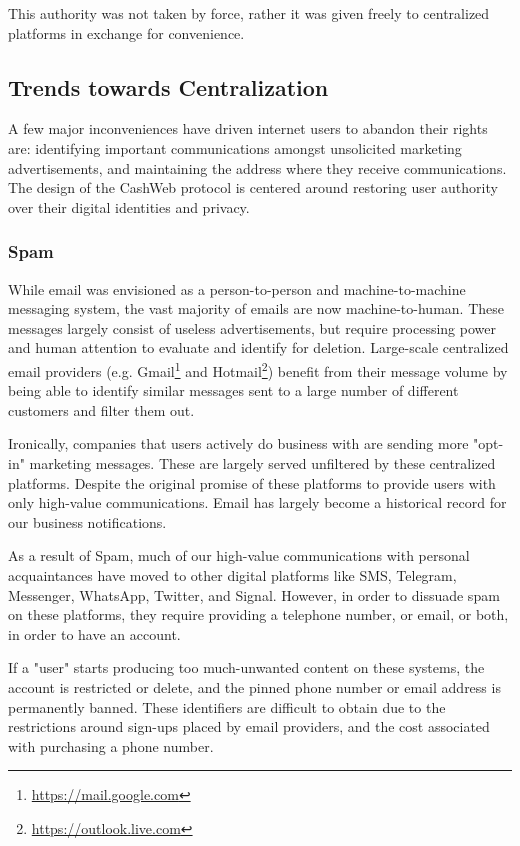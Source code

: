 \documentclass{article}
\begin{document}
This authority was not taken by force, rather it was given freely to centralized platforms in exchange for convenience.

\subsection{Trends towards Centralization}

A few major inconveniences have driven internet users to abandon their rights are: identifying important communications amongst unsolicited marketing advertisements, and maintaining the address where they receive communications. The design of the CashWeb protocol is centered around restoring user authority over their digital identities and privacy.

\subsubsection{Spam}

While email was envisioned as a person-to-person and machine-to-machine messaging system, the vast majority of emails are now machine-to-human. These messages largely consist of useless advertisements, but require processing power and human attention to evaluate and identify for deletion. Large-scale centralized email providers (e.g. Gmail\footnote{\url{https://mail.google.com}} and Hotmail\footnote{\url{https://outlook.live.com}}) benefit from their message volume by being able to identify similar messages sent to a large number of different customers and filter them out.

Ironically, companies that users actively do business with are sending more "opt-in" marketing messages. These are largely served unfiltered by these centralized platforms. Despite the original promise of these platforms to provide users with only high-value communications. Email has largely become a historical record for our business notifications.

As a result of Spam, much of our high-value communications with personal acquaintances have moved to other digital platforms like SMS, Telegram, Messenger, WhatsApp, Twitter, and Signal. However, in order to dissuade spam on these platforms, they require providing a telephone number, or email, or both, in order to have an account.

If a "user" starts producing too much-unwanted content on these systems, the account is restricted or delete, and the pinned phone number or email address is permanently banned. These identifiers are difficult to obtain due to the restrictions around sign-ups placed by email providers, and the cost associated with purchasing a phone number.
\end{document}
